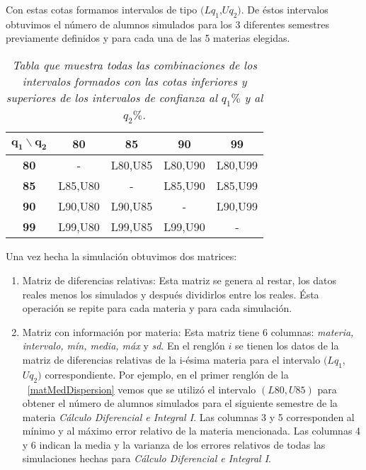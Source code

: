 Con estas cotas formamos intervalos de tipo $(Lq_{1}$,$Uq_{2})$. De éstos intervalos obtuvimos el número de alumnos simulados para los 3 diferentes semestres previamente definidos y para cada una de las 5 materias elegidas.

\begin{table}[H]
\centering
\begin{tabular}{|c|c|c|c|c|}
\hline 
$\textbf{q}_{\textbf{1}} \backslash \textbf{q}_{\textbf{2}}$ & \textbf{80} & \textbf{85} & \textbf{90} & \textbf{99} \\ 
\hline 
\textbf{80} & - & L80,U85 & L80,U90 & L80,U99 \\ 
\hline 
\textbf{85} & L85,U80 & - & L85,U90 & L85,U99 \\ 
\hline 
\textbf{90} & L90,U80 & L90,U85 & - & L90,U99 \\ 
\hline 
\textbf{99} & L99,U80 & L99,U85 & L99,U90 & - \\ 
\hline 
\end{tabular} 
\caption[\textit{Posibles valores para $q_{1}$ y $q_{2}$}]{\textit{Tabla que muestra todas las combinaciones de los intervalos formados con las cotas inferiores y superiores de los intervalos de confianza al $q_{1}\%$ y al $q_{2}\%$.}}\label{valoresQ1Q2}
\end{table}


Una vez hecha la simulación obtuvimos dos matrices:

\begin{enumerate}
\item Matriz de diferencias relativas: Esta matriz se genera al restar, los datos reales menos los simulados y después dividirlos entre los reales. Ésta operación se repite para cada materia y para cada simulación.

\item Matriz con información por materia: Esta matriz tiene 6 columnas: \textit{materia, intervalo, mín, media, máx} y \textit{sd}. En el renglón $i$ se tienen los datos de la matriz de diferencias relativas de la i-ésima materia para el intervalo $(Lq_{1}$,$Uq_{2})$ correspondiente. Por ejemplo, en el primer renglón de la \figurename{~\ref{matMedDispersion}} vemos que se utilizó el intervalo $(L80,U85)$ para obtener el número de alumnos simulados para el siguiente semestre de la materia \textit{Cálculo Diferencial e Integral I}. Las columnas 3 y 5 corresponden al mínimo y al máximo error relativo de la materia mencionada. Las columnas 4 y 6 indican la media y la varianza de los errores relativos de todas las simulaciones hechas para \textit{Cálculo Diferencial e Integral I}.
\end{enumerate}

